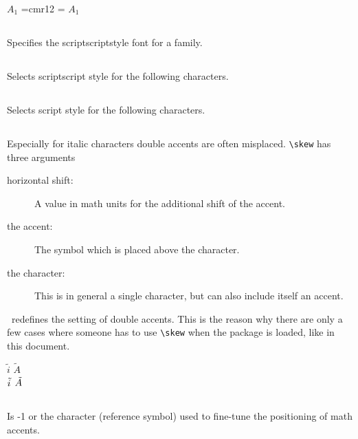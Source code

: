 \begin{table}[htb]
\begin{LTXexample}[width=0.25\linewidth]
$A_1$
\font\tenxii=cmr12
=\tenxii
$A_1$ 
\end{LTXexample}


\subsection{}
Specifies the scriptscriptstyle font for a family. 

\subsection{}
Selects scriptscript style for the following characters.

\subsection{}
Selects script style for the following characters.


\subsection{}
Especially for italic characters double accents are often misplaced. \verb+\skew+ has three arguments
\begin{description}
\item[horizontal shift:] A value in math units for the additional shift of the accent.
\item[the accent:] The symbol which is placed above the character.
\item[the character:] This is in general a single character, but can also include itself an accent.
\end{description}

\AmSmath\ redefines the setting of double accents. This is the reason why there are only a few
cases where someone has to use \verb+\skew+ when the package  is loaded, like
in this document.

\begin{LTXexample}[width=0.2\linewidth]
\large
$\tilde i$ \qquad $\tilde{A}$\\[5pt]
$\skew{3}{\tilde}{i}$ \qquad $\skew{7}{\tilde}{A}$
\end{LTXexample}

\subsection{}
Is -1 or the character (reference symbol) used to fine-tune the positioning of math accents.


\end{table}
